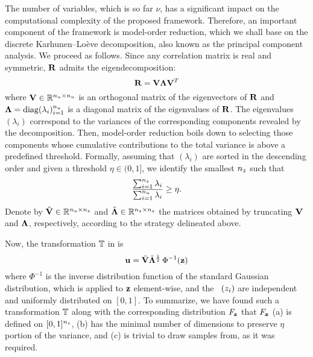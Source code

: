 The number of variables, which is so far $\nu$, has a significant impact on the
computational complexity of the proposed framework. Therefore, an important
component of the framework is model-order reduction, which we shall base on the
discrete Karhunen--Lo\`{e}ve decomposition, also known as the principal
component analysis. We proceed as follows. Since any correlation matrix is real
and symmetric, $\mathbf{R}$ admits the eigendecomposition:
\[
  \mathbf{R} = \mathbf{V} \mathbf{\Lambda} \mathbf{V}^T
\]
where $\mathbf{V} \in \mathbb{R}^{{n_u} \times {n_u}}$ is an orthogonal matrix of the
eigenvectors of $\mathbf{R}$ and $\mathbf{\Lambda} = \text{diag}(\lambda_i)_{i = 1}^{n_u}$
is a diagonal matrix of the eigenvalues of $\mathbf{R}$. The eigenvalues
$(\lambda_i)$ correspond to the variances of the corresponding components
revealed by the decomposition. Then, model-order reduction boils down to
selecting those components whose cumulative contributions to the total variance
is above a predefined threshold. Formally, assuming that $(\lambda_i)$ are
sorted in the descending order and given a threshold $\eta \in (0, 1]$, we
identify the smallest ${n_z}$ such that
\[
  \frac{\sum_{i = 1}^{n_z} \lambda_i}{\sum_{i = 1}^{n_u} \lambda_i} \geq \eta.
\]
Denote by $\tilde{\mathbf{V}} \in \mathbb{R}^{{n_u} \times {n_z}}$ and $\tilde{\mathbf{\Lambda}}
\in\mathbb{R}^{{n_z} \times {n_z}}$ the matrices obtained by truncating $\mathbf{V}$ and
$\mathbf{\Lambda}$, respectively, according to the strategy delineated above.

Now, the transformation $\mathbb{T}$ in  is
\[
  \mathbf{u} = \tilde{\mathbf{V}} \tilde{\mathbf{\Lambda}}^\frac{1}{2} \, \Phi^{-1}(\mathbf{z})
\]
where $\Phi^{-1}$ is the inverse distribution function of the standard Gaussian
distribution, which is applied to $\mathbf{z}$ element-wise, and the \rvs\ $(z_i)$ are
independent and uniformly distributed on $[0, 1]$. To summarize, we have found
such a transformation $\mathbb{T}$ along with the corresponding
distribution $F_{\mathbf{z}}$ that $F_{\mathbf{z}}$ (a) is defined on $[0,
1]^{n_z}$, (b) has the minimal number of dimensions to preserve $\eta$ portion of
the variance, and (c) is trivial to draw samples from, as it was required.
